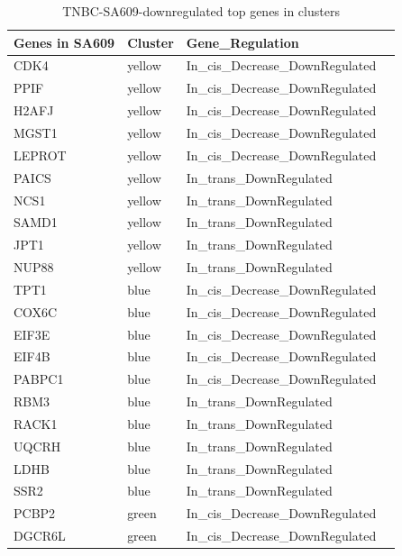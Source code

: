  
 \begin{table}[htbp]
   \centering
   \caption{TNBC-SA609-downregulated top genes in clusters}
     \begin{tabular}{|l|l|l|r}
     \hline
     Genes in SA609 & Cluster & Gene\_Regulation   \\
     \hline
     CDK4 & yellow & In\_cis\_Decrease\_DownRegulated   \\
     PPIF & yellow & In\_cis\_Decrease\_DownRegulated   \\
     H2AFJ & yellow & In\_cis\_Decrease\_DownRegulated  \\
     MGST1 & yellow & In\_cis\_Decrease\_DownRegulated   \\
     LEPROT & yellow & In\_cis\_Decrease\_DownRegulated   \\
     PAICS & yellow & In\_trans\_DownRegulated   \\
     NCS1 & yellow & In\_trans\_DownRegulated   \\
     SAMD1 & yellow & In\_trans\_DownRegulated   \\
     JPT1 & yellow & In\_trans\_DownRegulated   \\
     NUP88 & yellow & In\_trans\_DownRegulated   \\
     TPT1 & blue & In\_cis\_Decrease\_DownRegulated   \\
     COX6C & blue & In\_cis\_Decrease\_DownRegulated   \\
     EIF3E & blue & In\_cis\_Decrease\_DownRegulated   \\
     EIF4B & blue & In\_cis\_Decrease\_DownRegulated  \\
     PABPC1 & blue & In\_cis\_Decrease\_DownRegulated   \\
     RBM3 & blue & In\_trans\_DownRegulated   \\
     RACK1 & blue & In\_trans\_DownRegulated   \\
     UQCRH & blue & In\_trans\_DownRegulated   \\
     LDHB & blue & In\_trans\_DownRegulated   \\
     SSR2 & blue & In\_trans\_DownRegulated   \\
     PCBP2 & green & In\_cis\_Decrease\_DownRegulated   \\
     DGCR6L & green & In\_cis\_Decrease\_DownRegulated   \\

\end{tabular}
\end{table}
